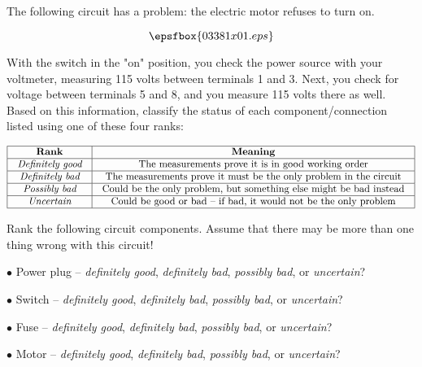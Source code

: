 

The following circuit has a problem: the electric motor refuses to turn on.

$$\epsfbox{03381x01.eps}$$

With the switch in the "on" position, you check the power source with your voltmeter, measuring 115 volts between terminals 1 and 3.  Next, you check for voltage between terminals 5 and 8, and you measure 115 volts there as well.  Based on this information, classify the status of each component/connection listed using one of these four ranks:


$$\vbox{\offinterlineskip
\halign{\strut
\vrule \quad\hfil # \ \hfil & 
\vrule \quad\hfil # \ \hfil \vrule \cr
\noalign{\hrule}
%
{\bf Rank} & {\bf Meaning} \cr
%
\noalign{\hrule}
%
{\it Definitely good} & The measurements prove it is in good working order \cr
%
\noalign{\hrule}
%
{\it Definitely bad} & The measurements prove it must be the only problem in the circuit \cr
%
\noalign{\hrule}
%
{\it Possibly bad} & Could be the only problem, but something else might be bad instead \cr
%
\noalign{\hrule}
%
{\it Uncertain} & Could be good or bad -- if bad, it would not be the only problem \cr
%
\noalign{\hrule}
} %
}$$ %

Rank the following circuit components.  Assume that there may be more than one thing wrong with this circuit!

\medskip
\item{$\bullet$} Power plug -- {\it definitely good}, {\it definitely bad}, {\it possibly bad}, or {\it uncertain}?
\item{$\bullet$} Switch -- {\it definitely good}, {\it definitely bad}, {\it possibly bad}, or {\it uncertain}?
\item{$\bullet$} Fuse -- {\it definitely good}, {\it definitely bad}, {\it possibly bad}, or {\it uncertain}?
\item{$\bullet$} Motor -- {\it definitely good}, {\it definitely bad}, {\it possibly bad}, or {\it uncertain}?
\medskip






